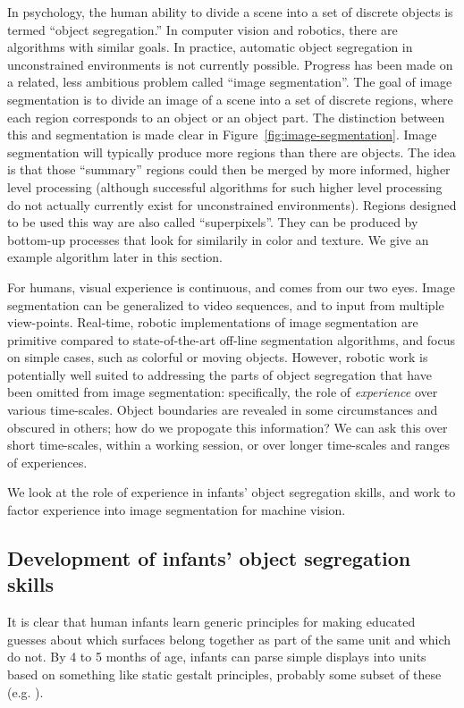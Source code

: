 In psychology, the human ability to divide a scene into a set of
discrete objects is termed ``object segregation.''  
In computer vision and robotics, there are algorithms with 
similar goals.  In practice, automatic object segregation
in unconstrained environments is not currently possible.
%
Progress has been made on a related, less ambitious problem
called ``image segmentation''.  The goal of image segmentation
is to divide an image of a scene into a set of discrete
regions, where each region corresponds to an object or 
an object part.  The distinction between this and 
segmentation is made clear in Figure~\ref{fig:image-segmentation}.
%
Image segmentation will typically produce more regions than there are
objects.  The idea is that those ``summary'' regions could then be
merged by more informed, higher level processing (although successful
algorithms for such higher level processing do not actually currently
exist for unconstrained environments).  Regions designed to be
used this way are also called ``superpixels''.
%
They can be produced by bottom-up processes that look for 
similarily in color and texture.  We give an example algorithm later
in this section.
%

For humans, visual experience is continuous, and comes from our two
eyes.  Image segmentation can be generalized to video sequences, and
to input from multiple view-points.  Real-time, robotic
implementations of image segmentation are primitive compared to
state-of-the-art off-line segmentation algorithms, and focus on simple
cases, such as colorful or moving objects.
%
However, robotic work is potentially well suited to addressing the
parts of object segregation that have been omitted from image
segmentation: specifically, the role of {\em experience} over
various time-scales.  Object boundaries are revealed in some
circumstances and obscured in others; how do we propogate this
information?  We can ask this over short time-scales, within
a working session, or over longer time-scales and ranges
of experiences.

We look at the role of experience in infants' object 
segregation skills, and work to factor experience into 
image segmentation for machine vision.


\subsection{Development of infants' object segregation skills}

It is clear that human infants learn generic principles for making
educated guesses about which surfaces belong together as part of the
same unit and which do not.  By 4 to 5 months of age, infants can
parse simple displays into units based on something like static
gestalt principles, probably some subset of these (e.g. ).

